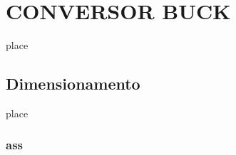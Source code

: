 \section{CONVERSOR BUCK}

\noindent place


\subsection{Dimensionamento}

place

\subsubsection{ass}



